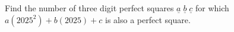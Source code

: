Find the number of three digit perfect squares $\underline{a}\;\underline{b}\;\underline{c}$ for which $a(2025^2)+b(2025)+c$ is also a perfect square.

